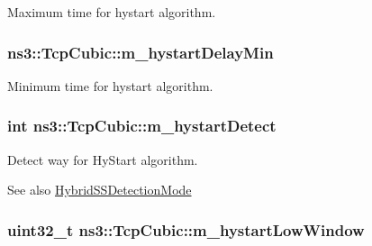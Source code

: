 Maximum time for hystart algorithm. 

\subsubsection[{\texorpdfstring{m\+\_\+hystart\+Delay\+Min}{m_hystartDelayMin}}]{ ns3\+::\+Tcp\+Cubic\+::m\+\_\+hystart\+Delay\+Min\hspace{0.3cm}{\ttfamily [private]}}\hypertarget{classns3_1_1TcpCubic_a63dffc9a29dc6577a99c4046efcb01f0}{}\label{classns3_1_1TcpCubic_a63dffc9a29dc6577a99c4046efcb01f0}


Minimum time for hystart algorithm. 

\subsubsection[{\texorpdfstring{m\+\_\+hystart\+Detect}{m_hystartDetect}}]{\setlength{\rightskip}{0pt plus 5cm}int ns3\+::\+Tcp\+Cubic\+::m\+\_\+hystart\+Detect\hspace{0.3cm}{\ttfamily [private]}}\hypertarget{classns3_1_1TcpCubic_a34e8c17f1c5c470fa39aa77d6d1bbda5}{}\label{classns3_1_1TcpCubic_a34e8c17f1c5c470fa39aa77d6d1bbda5}


Detect way for Hy\+Start algorithm. 

\begin{DoxySeeAlso}{See also}
\hyperlink{classns3_1_1TcpCubic_adc8acf4d99d45daa4bff0c47dc9aa707}{Hybrid\+S\+S\+Detection\+Mode} 
\end{DoxySeeAlso}
\subsubsection[{\texorpdfstring{m\+\_\+hystart\+Low\+Window}{m_hystartLowWindow}}]{\setlength{\rightskip}{0pt plus 5cm}uint32\+\_\+t ns3\+::\+Tcp\+Cubic\+::m\+\_\+hystart\+Low\+Window\hspace{0.3cm}{\ttfamily [private]}}\hypertarget{classns3_1_1TcpCubic_af23b1714553886c496927ba6d75269b4}{}\label{classns3_1_1TcpCubic_af23b1714553886c496927ba6d75269b4}


